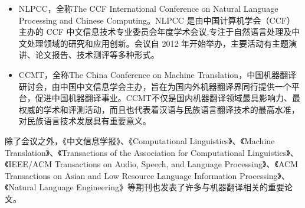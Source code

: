 \begin{itemize}
\vspace{0.5em}
\item NLPCC，全称The CCF International Conference on Natural Language Processing and Chinese Computing。NLPCC 是由中国计算机学会（CCF）主办的 CCF 中文信息技术专业委员会年度学术会议,专注于自然语言处理及中文处理领域的研究和应用创新。会议自 2012 年开始举办，主要活动有主题演讲、论文报告、技术测评等多种形式。
\vspace{0.5em}
\item CCMT，全称The China Conference on Machine Translation，中国机器翻译研讨会，由中国中文信息学会主办，旨在为国内外机器翻译界同行提供一个平台，促进中国机器翻译事业。CCMT不仅是国内机器翻译领域最具影响力、最权威的学术和评测活动，而且也代表着汉语与民族语言翻译技术的最高水准，对民族语言技术发展具有重要意义。
\vspace{0.5em}
\end{itemize}

除了会议之外，《中文信息学报》、《Computational Linguistics》、《Machine Translation》、《Transactions of the Association for Computational Linguistics》、《IEEE/ACM Transactions on Audio, Speech, and Language Processing》、《ACM Transactions on Asian and Low Resource Language Information Processing》、《Natural Language Engineering》等期刊也发表了许多与机器翻译相关的重要论文。











